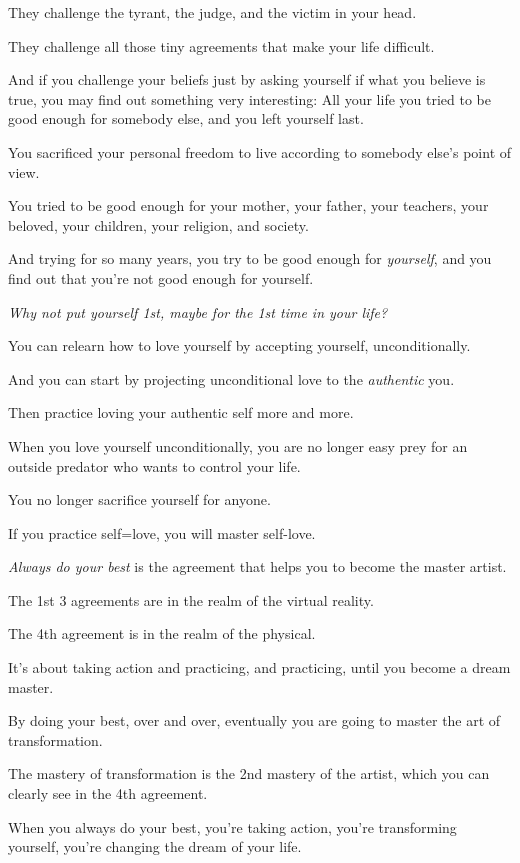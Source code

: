 \documentclass{article}
\numberwithin{equation}{section}
\begin{document}
They challenge the tyrant, the judge, and the victim in your head.

They challenge all those tiny agreements that make your life difficult.

%
And if you challenge your beliefs just by asking yourself if what you believe is true, you may find out something very interesting: All your life you tried to be good enough for somebody else, and you left yourself last.

You sacrificed your personal freedom to live according to somebody else's point of view.

You tried to be good enough for your mother, your father, your teachers, your beloved, your children, your religion, and society.

And trying for so many years, you try to be good enough for \textit{yourself}, and you find out that you're not good enough for yourself.

%
\textit{Why not put yourself 1st, maybe for the 1st time in your life?}

You can relearn how to love yourself by accepting yourself, unconditionally.

And you can start by projecting unconditional love to the \textit{authentic} you.

Then practice loving your authentic self more and more.

When you love yourself unconditionally, you are no longer easy prey for an outside predator who wants to control your life.

You no longer sacrifice yourself for anyone.

If you practice self=love, you will master self-love.

%
\textit{Always do your best} is the agreement that helps you to become the master artist.

The 1st 3 agreements are in the realm of the virtual reality.

The 4th agreement is in the realm of the physical.

It's about taking action and practicing, and practicing, until you become a dream master.

By doing your best, over and over, eventually you are going to master the art of transformation.

The mastery of transformation is the 2nd mastery of the artist, which you can clearly see in the 4th agreement.

When you always do your best, you're taking action, you're transforming yourself, you're changing the dream of your life.
\end{document}
